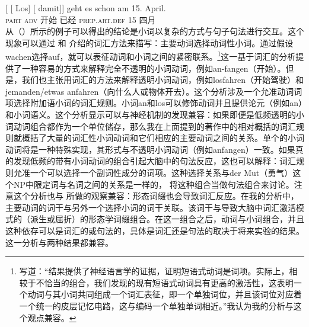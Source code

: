 \begin{exe}
\begin{xlist}[iv.]
\begin{exe}
\begin{xlist}[iv.]
\ex
\gll {}[ [ Los]        [ damit]]    geht es schon   am 15. April.\footnotemark\\
       {}        {}        \textsc{part}  {}        \textsc{adv} 开始 \expl{} 已经 \textsc{prep}.\textsc{art}.\textsc{def} 15 四月\\%
%
\zl
从（）所示的例子可以得出的结论是小词以复杂的方式与句子句法进行交互。这个现象可以通过 和 介绍的词汇方法来描写：主要动词选择动词性小词。通过假设wachen选择auf，就可以表征动词和小词之间的紧密联系。\footnote{%
   \citet[]{CSP2010a}写道：“结果提供了神经语言学的证据，证明短语式动词是词项。实际上，相较于不恰当的组合，我们发现的现有短语式动词具有更高的激活性，这表明一个动词与其小词共同组成一个词汇表征，即一个单独词位，并且该词位对应着一个统一的皮层记忆电路，这与编码一个单独单词相近。”我认为我的分析与这个观点兼容。
}这一基于词汇的分析提供了一种容易的方式来解释完全不透明的小词动词，例如an-fangen（开始）。但是，我们也主张用词汇的方法来解释透明小词动词，例如losfahren（开始驾驶）和jemanden/etwas anfahren（向什么人或物体开去）。这个分析涉及一个允准动词词项选择附加语小词的词汇规则。小词an和los可以修饰动词并且提供论元（例如an）和小词语义。这个分析显示可以与神经机制的发现兼容：如果即便是低频透明的小词动词组合都作为一个单位储存，那么我在上面提到的著作中的相对概括的词汇规则就概括了大量的词汇性小词动词和它们相应的主要动词之间的关系。单个的小词动词将是一种特殊实现，其形式与不透明小词动词（例如anfangen）一致。如果真的发现低频的带有小词动词的组合引起大脑中的句法反应，这也可以解释：词汇规则允准一个可以选择一个副词性成分的词项。这种选择关系与der Mut（勇气）这个NP中限定词与名词之间的关系是一样的， \citet[]{CSP2010a}将这种组合当做句法组合来讨论。注意这个分析也与 \citet*{SPP2005a-u}所做的观察兼容：形态词缀也会导致词汇反应。在我的分析中，主要动词的词干与另外一个选择小词的词干关联。该词干与导致大脑中词汇激活模式的（派生或屈折）的形态学词缀组合。在这一组合之后，动词与小词组合，并且这种依存可以是词汇的或句法的，具体是词汇还是句法的取决于将来实验的结果。这一分析与两种结果都兼容。

\end{xlist}
\end{exe}
\end{xlist}
\end{exe}
